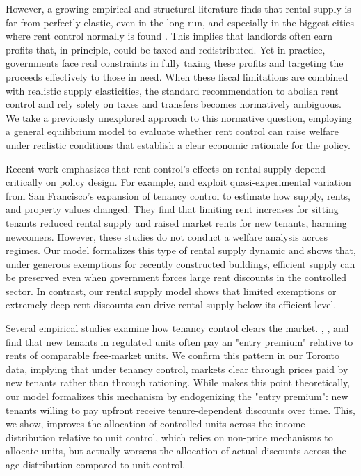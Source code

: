 \documentclass[parskip=full]{article}
\begin{document}
However, a growing empirical and structural literature finds that rental supply is far from perfectly elastic, even in the long run, and especially in the biggest cities where rent control normally is found \citep{orr-1968,cy-1994,susin-2002,fack-2006,sy-2020,rs-2023}. This implies that landlords often earn profits that, in principle, could be taxed and redistributed. Yet in practice, governments face real constraints in fully taxing these profits and targeting the proceeds effectively to those in need. When these fiscal limitations are combined with realistic supply elasticities, the standard recommendation to abolish rent control and rely solely on taxes and transfers becomes normatively ambiguous. We take a previously unexplored approach to this normative question, employing a general equilibrium model to evaluate whether rent control can raise welfare under realistic conditions that establish a clear economic rationale for the policy.

Recent work emphasizes that rent control’s effects on rental supply depend critically on policy design. For example, \citet{diamond-2019} and \citet{dmq-2019} exploit quasi-experimental variation from San Francisco’s expansion of tenancy control to estimate how supply, rents, and property values changed. They find that limiting rent increases for sitting tenants reduced rental supply and raised market rents for new tenants, harming newcomers. However, these studies do not conduct a welfare analysis across regimes. Our model formalizes this type of rental supply dynamic and shows that, under generous exemptions for recently constructed buildings, efficient supply can be preserved even when government forces large rent discounts in the controlled sector. In contrast, our rental supply model shows that limited exemptions or extremely deep rent discounts can drive rental supply below its efficient level.

Several empirical studies examine how tenancy control clears the market. \citet{nagy-1997}, \citet{early-2000}, and \citet{cjq-2023} find that new tenants in regulated units often pay an "entry premium" relative to rents of comparable free-market units. We confirm this pattern in our Toronto data, implying that under tenancy control, markets clear through prices paid by new tenants rather than through rationing. While \citet{arnott-1995} makes this point theoretically, our model formalizes this mechanism by endogenizing the "entry premium": new tenants willing to pay upfront receive tenure-dependent discounts over time. This, we show, improves the allocation of controlled units across the income distribution relative to unit control, which relies on non-price mechanisms to allocate units, but actually worsens the allocation of actual discounts across the age distribution compared to unit control.
\end{document}
